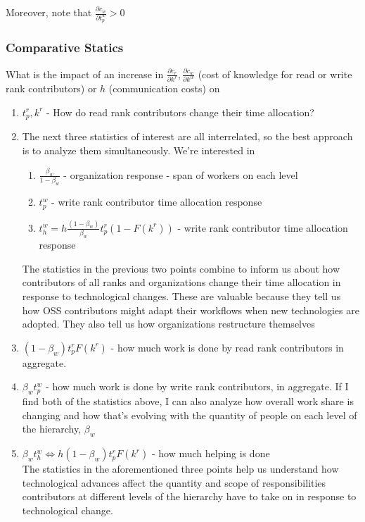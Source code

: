 \documentclass[source/paper/main.tex]{subfiles}
\begin{document}
Moreover, note that $\frac{\partial c_w}{\partial t_p^w}>0$

\subsubsection{Comparative Statics}
What is the impact of an increase in $\frac{\partial c_r}{\partial k^r}, \frac{\partial c_w}{\partial k^w}$ (cost of knowledge for read or write rank contributors) or $h$ (communication costs) on
\begin{enumerate}
    \item $t_p^r, k^r$ - How do read rank contributors change their time allocation?
    \item The next three statistics of interest are all interrelated, so the best approach is to analyze them simultaneously. We're interested in
    \begin{enumerate}
        \item $\frac{\beta_w}{1-\beta_w}$ - organization response - span of workers on each level
        \item $t_p^w$ - write rank contributor time allocation response
        \item $t_h^w = h \frac{(1-\beta_w)}{\beta_w} t_p^r(1-F(k^r))$ - write rank contributor time allocation response
    \end{enumerate}
    The statistics in the previous two points combine to inform us about how contributors of all ranks and organizations change their time allocation in response to technological changes. These are valuable because they tell us how OSS contributors might adapt their workflows when new technologies are adopted. They also tell us how organizations restructure themselves 
    
    \item $(1-\beta_w) t_p^r F(k^r)$ - how much work is done by read rank contributors in aggregate. 
    \item $\beta_w t_p^w$ - how much work is done by write rank contributors, in aggregate. If I find both of the statistics above, I can also analyze how overall work share is changing and how that's evolving with the quantity of people on each level of the hierarchy, $\beta_w$
    \item $\beta_w t_h^w \iff h (1-\beta_w) t_p^rF(k^r)$ - how much helping is done \\
    The statistics in the aforementioned three points help us understand how technological advances affect the quantity and scope of responsibilities contributors at different levels of the hierarchy have to take on in response to technological change. 
\end{enumerate}
\end{document}
